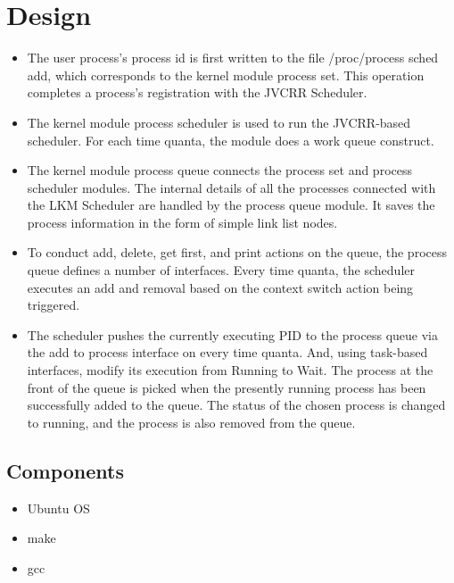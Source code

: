 \section{Design }
\begin{itemize}
\item The user process's process id is first written to the file /proc/process sched add, which corresponds to the kernel module process set. This operation completes a process's registration with the JVCRR Scheduler.
\item The kernel module process scheduler is used to run the JVCRR-based scheduler. For each time quanta, the module does a work queue construct.
\item The kernel module process queue connects the process set and process scheduler modules. The internal details of all the processes connected with the LKM Scheduler are handled by the process queue module. It saves the process information in the form of simple link list nodes.
\item To conduct add, delete, get first, and print actions on the queue, the process queue defines a number of interfaces. Every time quanta, the scheduler executes an add and removal based on the context switch action being triggered.
\item The scheduler pushes the currently executing PID to the process queue via the add to process interface on every time quanta. And, using task-based interfaces, modify its execution from Running to Wait. The process at the front of the queue is picked when the presently running process has been successfully added to the queue. The status of the chosen process is changed to running, and the process is also removed from the queue.
\end{itemize}

\subsection{Components}
\begin{itemize}
\item Ubuntu OS
\item make
\item gcc
\end{itemize}

